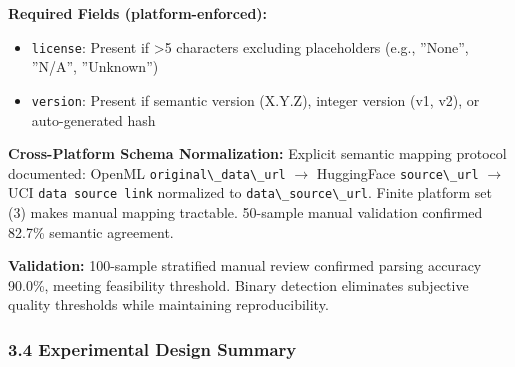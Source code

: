 \textbf{Required Fields (platform-enforced):}
\begin{itemize}
\item \texttt{license}: Present if >5 characters excluding placeholders (e.g., ''None'', ''N/A'', ''Unknown'')
\item \texttt{version}: Present if semantic version (X.Y.Z), integer version (v1, v2), or auto-generated hash
\end{itemize}

\textbf{Cross-Platform Schema Normalization:} Explicit semantic mapping protocol documented: OpenML \texttt{original\textbackslash \_data\textbackslash \_url} $\rightarrow$ HuggingFace \texttt{source\textbackslash \_url} $\rightarrow$ UCI \texttt{data source link} normalized to \texttt{data\textbackslash \_source\textbackslash \_url}. Finite platform set (3) makes manual mapping tractable. 50-sample manual validation confirmed 82.7\% semantic agreement.

\textbf{Validation:} 100-sample stratified manual review confirmed parsing accuracy 90.0\%, meeting feasibility threshold. Binary detection eliminates subjective quality thresholds while maintaining reproducibility.

\subsubsection{3.4 Experimental Design Summary}

\begin{table}[htbp]
\centering
{}
\end{table}
